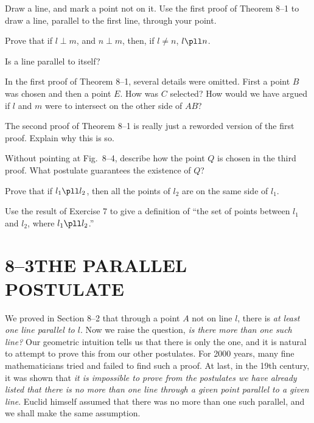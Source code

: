 \documentclass[11pt]{book}
\theoremstyle{bkplain}
\theoremstyle{XIplainnote}
\theoremstyle{bkplain}
\theoremstyle{bkplain}
\begin{document}
\begin{exercisecols}
\begin{exlist}
\item Draw a line, and mark a point not on it. Use the first proof of Theorem
  8--1 to draw a line, parallel to the first line, through your point.
\item Prove that if $l \perp m$, and $n \perp m$, then, if $l \neq n$,
  $l \pll n$.
\item Is a line parallel to itself?
\item In the first proof of Theorem 8--1, several details were omitted. First
  a point $B$ was chosen and then a point $E$. How was $C$ selected? How would
  we have argued if $l$ and $m$ were to intersect on the other side of $AB$?
\item The second proof of Theorem 8--1 is really just a reworded version of
  the first proof. Explain why this is so.
\item Without pointing at Fig.~8--4, describe how the point $Q$ is chosen in
  the third proof. What postulate guarantees the existence of $Q$?
\item Prove that if $l_1 \pll l_2$, then all the points of $l_2$ are on the
  same side of $l_1$.
\item Use the result of Exercise 7 to give a definition of ``the set of points
  between $l_1$ and $l_2$, where $l_1 \pll l_2$.''
\end{exlist}
\end{exercisecols}

\section*{8--3\quad THE PARALLEL POSTULATE}

We proved in Section 8--2 that through a point $A$ not on line $l$, there is
\emph{at least one line parallel to $l$}. Now we raise the question, \emph{is
there more than one such line?} Our geometric intuition tells us that there is
only the one, and it is natural to attempt to prove this from our other
postulates. For 2000 years, many fine mathematicians tried and failed to find
such a proof. At last, in the 19th century, it was shown that \emph{it is
impossible to prove from the postulates we have already listed that there is
no more than one line through a given point parallel to a given line}. Euclid
himself assumed that there was no more than one such parallel, and we shall
make the same assumption.
\end{document}
